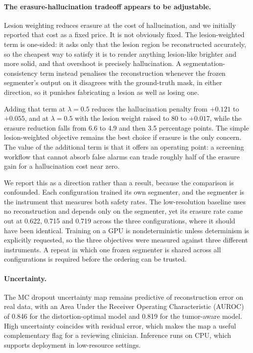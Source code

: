 \documentclass[11pt,a4paper]{article}
\begin{document}
\paragraph{The erasure-hallucination tradeoff appears to be adjustable.}
Lesion weighting reduces erasure at the cost of hallucination, and we initially reported that cost as a fixed price. It is not obviously fixed. The lesion-weighted term is one-sided: it asks only that the lesion region be reconstructed accurately, so the cheapest way to satisfy it is to render anything lesion-like brighter and more solid, and that overshoot is precisely hallucination. A segmentation-consistency term instead penalises the reconstruction whenever the frozen segmenter's output on it disagrees with the ground-truth mask, in either direction, so it punishes fabricating a lesion as well as losing one.

Adding that term at $\lambda = 0.5$ reduces the hallucination penalty from $+0.121$ to $+0.055$, and at $\lambda = 0.5$ with the lesion weight raised to 80 to $+0.017$, while the erasure reduction falls from 6.6 to 4.9 and then 3.5 percentage points. The simple lesion-weighted objective remains the best choice if erasure is the only concern. The value of the additional term is that it offers an operating point: a screening workflow that cannot absorb false alarms can trade roughly half of the erasure gain for a hallucination cost near zero.

We report this as a direction rather than a result, because the comparison is confounded. Each configuration trained its own segmenter, and the segmenter is the instrument that measures both safety rates. The low-resolution baseline uses no reconstruction and depends only on the segmenter, yet its erasure rate came out at 0.622, 0.715 and 0.719 across the three configurations, where it should have been identical. Training on a GPU is nondeterministic unless determinism is explicitly requested, so the three objectives were measured against three different instruments. A repeat in which one frozen segmenter is shared across all configurations is required before the ordering can be trusted.

\paragraph{Uncertainty.}
The MC dropout uncertainty map remains predictive of reconstruction error on real data, with an Area Under the Receiver Operating Characteristic (AUROC) of 0.846 for the distortion-optimal model and 0.819 for the tumor-aware model. High uncertainty coincides with residual error, which makes the map a useful complementary flag for a reviewing clinician. Inference runs on CPU, which supports deployment in low-resource settings.
\end{document}
